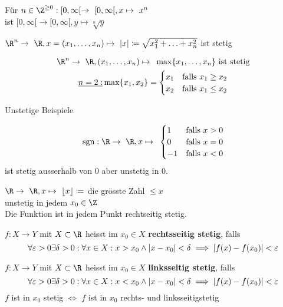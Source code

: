\begin{bsp*}
	Für $n \in \Z^{\geq 0} : [0,\infty[ \rightarrow [0,\infty[, x \mapsto x^n$\\
	ist $[0,\infty[ \rightarrow [0,\infty[, y \mapsto \sqrt[n]{y}$
\end{bsp*}
\begin{bsp*}
	$\R^n \rightarrow \R , x = ( x_1 , \dotsc , x_n ) \mapsto \abs{x} \coloneqq \sqrt{x_1^2 + \dotsc + x_n^2}$ ist stetig
\end{bsp*}
\begin{bsp*}
	\begin{gather*}
		\R^n \rightarrow \R , (x_1 , \dotsc , x_n) \mapsto \max\{x_1 , \dotsc , x_n\} \text{ ist stetig}\\
		\underline{n=2:} \max\{ x_1 , x_2 \} = \begin{cases}
			x_1	&\text{falls } x_1 \geq x_2	\\
			x_2	&\text{falls } x_1 \leq x_2	
		\end{cases}
	\end{gather*}
\end{bsp*}

Unstetige Beispiele\\
\begin{bsp*}
	\[ \sgn: \R \rightarrow \R , x \mapsto \begin{cases}
		1	&\text{falls } x > 0	\\
		0	&\text{falls } x = 0	\\
		-1	&\text{falls } x < 0	
	\end{cases} \]
	ist stetig ausserhalb von $0$ aber unstetig in $0$.
\end{bsp*}
\begin{bsp*}
	$\R \rightarrow \R , x \mapsto \lfloor x \rfloor \coloneqq$ die grösste Zahl $\leq x$\\
	unstetig in jedem $x_0 \in \Z$\\
	Die Funktion ist in jedem Punkt rechtseitig stetig.
\end{bsp*}
\begin{def*}[note = rechts-/linksseitige Stetigkeit , index = Stetigkeit]
	$f: X \rightarrow Y$ mit $X \subset \R$ heisst im $x_0 \in X$ \textbf{rechtsseitig stetig}, falls\\
	\[ \forall \epsilon > 0 \exists \delta > 0 : \forall x \in X : x > x_0 \wedge \abs{x-x_0} < \delta \implies \abs{f(x)-f(x_0)} < \epsilon \]
	
	$f: X \rightarrow Y$ mit $X \subset \R$ heisst im $x_0 \in X$ \textbf{linksseitig stetig}, falls\\
	\[ \forall \epsilon > 0 \exists \delta > 0 : \forall x \in X : x < x_0 \wedge \abs{x-x_0} < \delta \implies \abs{f(x)-f(x_0)} < \epsilon \]	
	$f$ ist in $x_0$ stetig $\iff$ $f$ ist in $x_0$ rechts- und linksseitigstetig
\end{def*}

